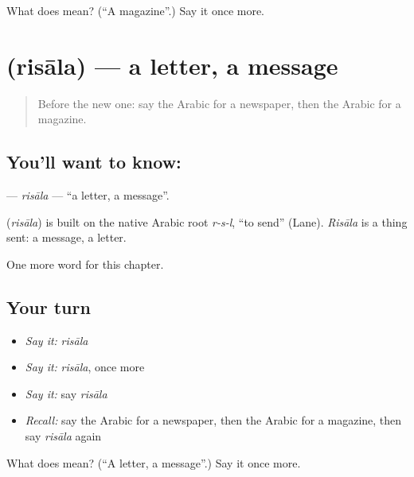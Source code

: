 \begin{tcolorbox}[breakable,colback=teal!4,colframe=teal!35!black,title={Before you move on}]
What does  mean? (\textquotedblleft{}A magazine\textquotedblright{}.) Say it once more.
\end{tcolorbox}
\section[\texorpdfstring{\ar{رسالة} (risāla)}{رسالة (risāla)}]{ (risāla) — a letter, a message}

\label{lesson:AR-C117-risala}



\begin{quote}
Before the new one: say the Arabic for a newspaper, then the Arabic for a magazine.
\end{quote}

\subsection*{You'll want to know: }
\textbf{} — \emph{risāla} — \textquotedblleft{}a letter, a message\textquotedblright{}.

\begin{cousinweb}
\textbf{} (\emph{risāla}) is built on the native Arabic root \emph{r-s-l}, \textquotedblleft{}to send\textquotedblright{} (Lane). \emph{Risāla} is a thing sent: a message, a letter.
\end{cousinweb}

\begin{grammarlens}[title={What you've built}]
One more word for this chapter.
\end{grammarlens}

\subsection*{Your turn}
\begin{itemize}
\raggedright
  \item \emph{Say it:} \emph{risāla}
  \item \emph{Say it:} \emph{risāla}, once more
  \item \emph{Say it:} say \emph{risāla}
  \item \emph{Recall:} say the Arabic for a newspaper, then the Arabic for a magazine, then say \emph{risāla} again
\end{itemize}

\begin{tcolorbox}[breakable,colback=teal!4,colframe=teal!35!black,title={Before you move on}]
What does  mean? (\textquotedblleft{}A letter, a message\textquotedblright{}.) Say it once more.
\end{tcolorbox}
